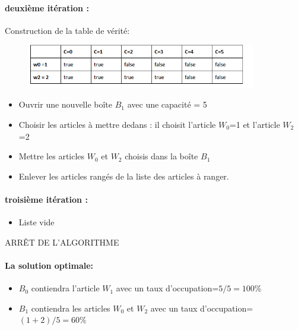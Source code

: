 \documentclass[12pt]{article}
\begin{document}
\paragraph{deuxième itération :}
Construction de la table de vérité:\linebreak
\begin{figure}[H]
  \includegraphics[width=10cm]{../figures/tabit2.png}
\end{figure}
\begin{itemize}
  \item Ouvrir une nouvelle boîte $B_1$ avec une capacité = 5
  \item Choisir les articles à mettre dedans : il choisit l’article $W_0$=1 et l’article $W_2$=2
  \item Mettre les articles $W_0$ et $W_2$ choisis dans la boîte $B_1$
  \item Enlever les articles rangés de la liste des articles à ranger. 
\end{itemize}
\paragraph{troisième itération :}
\begin{itemize}
    \item Liste vide
\end{itemize}
ARRÊT DE L’ALGORITHME
\paragraph{La solution optimale:}
\begin{itemize}
    \item $B_0$ contiendra l'article $W_1$ avec un taux d'occupation=$5/5 =100\%$
    \item $B_1$ contiendra les articles $W_0$ et $W_2$ avec un taux d'occupation=$ (1+2)/5 =  60\%$
  \end{itemize}
  
\end{document}
